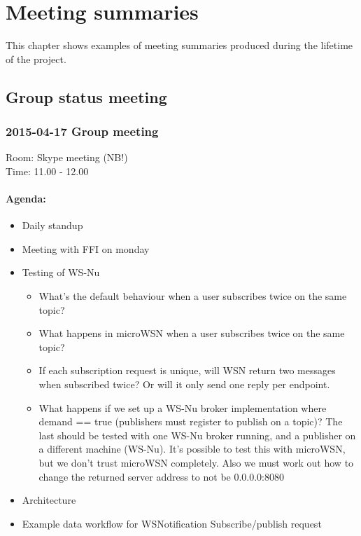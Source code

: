 \chapter{Meeting summaries}
\label{appendix-meeting_summaries}

This chapter shows examples of meeting summaries produced during the lifetime of the project. 

\section{Group status meeting}

\subsection*{2015-04-17 Group meeting}
Room: Skype meeting (NB!) \\
\noindent Time: 11.00 - 12.00

\subsubsection*{Agenda:}
\begin{itemize}
\setlength{\itemsep}{0cm}%
\item Daily standup
\item Meeting with FFI on monday
\item Testing of WS-Nu \begin{itemize}
\setlength{\itemsep}{0cm}%
\item What’s the default behaviour when a user subscribes twice on the same topic?
\item What happens in microWSN when a user subscribes twice on the same topic?
\item If each subscription request is unique, will WSN return two messages when subscribed twice? Or will it only send one reply per endpoint. 
\item What happens if we set up a WS-Nu broker implementation where demand == true (publishers must register to publish on a topic)? The last should be tested with one WS-Nu broker running, and a publisher on a different machine (WS-Nu). It’s possible to test this with microWSN, but we don’t trust microWSN completely. Also we must work out how to change the returned server address to not be 0.0.0.0:8080 
\end{itemize}
\item Architecture 
\item Example data workflow for WSNotification Subscribe/publish request
\end{itemize}


